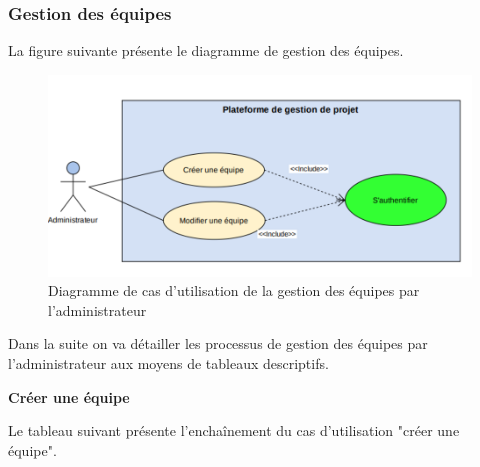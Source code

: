\subsubsection{	Gestion des équipes}
\hspace{4mm}La figure suivante présente le diagramme de gestion des équipes.
\begin{figure}[h]
    \centering
    \includegraphics[scale=1]{figures/anis11.png}
    \caption{Diagramme de cas d'utilisation de la gestion des équipes par l’administrateur}
    \label{fig:cas_gereq}
\end{figure}
\par Dans la suite on va détailler les processus de gestion des équipes par l’administrateur aux moyens de tableaux descriptifs.
\newpage
\par \textbf{ 	Créer une équipe}
\par Le tableau suivant présente l'enchaînement du cas d'utilisation "créer une équipe".
